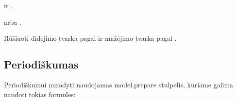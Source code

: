 \documentclass[letterpaper,10pt,lithuanian]{sphinxmanual}
\begin{document}
\begin{fulllineitems}
\begin{fulllineitems}
\end{fulllineitems}



\begin{fulllineitems}

\pysigstartsignatures
{}
\pysigstopsignatures
\sphinxAtStartPar
{} ir .

\end{fulllineitems}



\begin{fulllineitems}

\pysigstartsignatures
{}
\pysigstopsignatures
\sphinxAtStartPar
{} arba .

\end{fulllineitems}



\begin{fulllineitems}

\pysigstartsignatures
{}
\pysigstopsignatures
\sphinxAtStartPar
Rūšiuoti didėjimo tvarka  pagal  ir mažėjimo tvarka pagal .

\end{fulllineitems}


\end{fulllineitems}



\subsection{Periodiškumas}
\label{\detokenize{formules:periodiskumas}}
\sphinxAtStartPar
Periodiškumui nurodyti naudojamas model.prepare stulpelis, kuriame galima
naudoti tokias formules:
\end{document}

